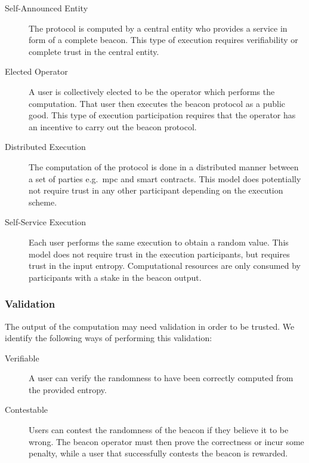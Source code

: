 \begin{description}
    \item[Self-Announced Entity] The protocol is computed by a central entity who provides a service in form of a complete beacon. This type of execution requires verifiability or complete trust in the central entity.
    \item[Elected Operator] A user is collectively elected to be the operator which performs the computation. That user then executes the beacon protocol as a public good. This type of execution participation requires that the operator has an incentive to carry out the beacon protocol.
    \item[Distributed Execution] The computation of the protocol is done in a distributed manner between a set of parties e.g.\ \gls{mpc} and smart contracts. This model does potentially not require trust in any other participant depending on the execution scheme.
    \item[Self-Service Execution] Each user performs the same execution to obtain a random value. This model does not require trust in the execution participants, but requires trust in the input entropy. Computational resources are only consumed by participants with a stake in the beacon output.
\end{description}

\subsubsection{Validation}
The output of the computation may need validation in order to be trusted. We identify the following ways of performing this validation:
\begin{description}
    \item [Verifiable] A user can verify the randomness to have been correctly computed from the provided entropy. 
    \item [Contestable] Users can contest the randomness of the beacon if they believe it to be wrong. The beacon operator must then prove the correctness or incur some penalty, while a user that successfully contests the beacon is rewarded. 
\end{description}

